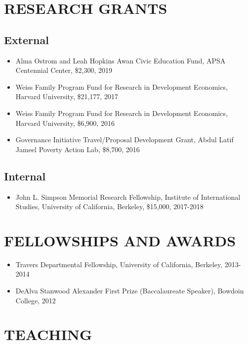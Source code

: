 \documentclass[11pt]{article}
\begin{document}
\vspace{3mm}
\section*{RESEARCH GRANTS}
\subsection*{External}
\begin{itemize}
\item[]Alma Ostrom and Leah Hopkins Awan Civic Education Fund, APSA Centennial Center, \$2,300, 2019

\item[] Weiss Family Program Fund for Research in Development Economics, Harvard University, \$21,177, 2017
\item[] Weiss Family Program Fund for Research in Development Economics, Harvard University, \$6,900, 2016
\item[] Governance Initiative Travel/Proposal Development Grant, Abdul Latif Jameel Poverty Action Lab, \$8,700, 2016	
	 
\end{itemize}

\subsection*{Internal}
\begin{itemize}
\item[]John L. Simpson Memorial Research Fellowship, Institute of International Studies, University of California, Berkeley, \$15,000, 2017-2018
\end{itemize}

\vspace{3mm}
\section*{FELLOWSHIPS AND AWARDS} 
\begin{itemize}
	
	\item[]Travers Departmental Fellowship, University of California, Berkeley, 2013-2014
	\item[]DeAlva Stanwood Alexander First Prize (Baccalaureate Speaker), Bowdoin College, 2012
\end{itemize}
\vspace{3mm}
\section*{TEACHING}
\end{document}
